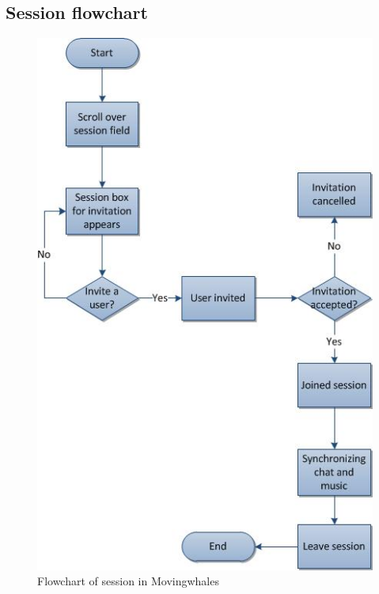 \clearpage
\subsection{Session flowchart}

\begin{figure}[h!]
\centering
\includegraphics[scale=0.5]{design/figures/session_flowchart}
\caption{Flowchart of session in Movingwhales}
\end{figure}


